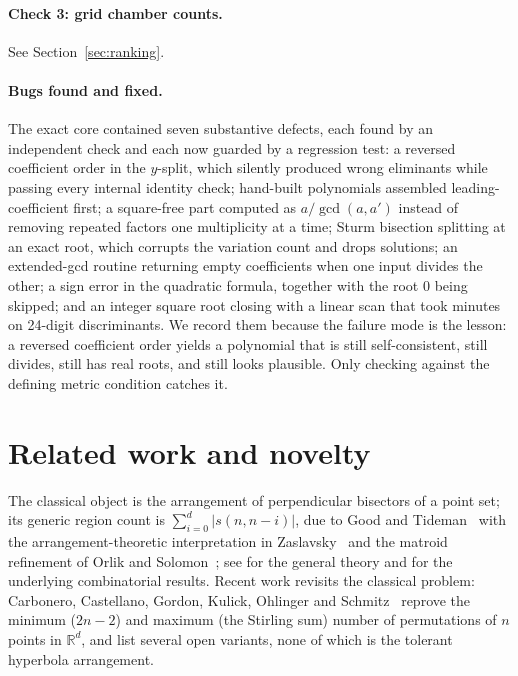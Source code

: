 ﻿\documentclass[11pt,a4paper]{article}
\theoremstyle{definition}
\theoremstyle{remark}
\newcommand{\RR}{\mathbb{R}}
\begin{document}
\paragraph{Check 3: grid chamber counts.}
See Section~\ref{sec:ranking}.

\paragraph{Bugs found and fixed.}
The exact core contained seven substantive defects, each found by an independent
check and each now guarded by a regression test: a reversed coefficient order in
the $y$-split, which silently produced wrong eliminants while passing every
internal identity check; hand-built polynomials assembled leading-coefficient
first; a square-free part computed as $a/\gcd(a,a')$ instead of removing repeated
factors one multiplicity at a time; Sturm bisection splitting at an exact root,
which corrupts the variation count and drops solutions; an extended-gcd routine
returning empty coefficients when one input divides the other; a sign error in
the quadratic formula, together with the root $0$ being skipped; and an integer
square root closing with a linear scan that took minutes on 24-digit
discriminants.  We record them because the failure mode is the lesson: a
reversed coefficient order yields a polynomial that is still self-consistent,
still divides, still has real roots, and still looks plausible.  Only checking
against the defining metric condition catches it.

\section{Related work and novelty}
\label{sec:related}

The classical object is the arrangement of perpendicular bisectors of a point
set; its generic region count is $\sum_{i=0}^{d}|s(n,n-i)|$, due to Good and
Tideman~\cite{good1977} with the arrangement-theoretic interpretation in
Zaslavsky~\cite{zaslavsky2002} and the matroid refinement of Orlik and
Solomon~\cite{orlik1980}; see \cite{orlik1992} for the general theory and
\cite{zaslavsky1975,rota1964} for the underlying combinatorial results.  Recent
work revisits the classical problem: Carbonero, Castellano, Gordon, Kulick,
Ohlinger and Schmitz~\cite{carbonero2022} reprove the minimum ($2n-2$) and
maximum (the Stirling sum) number of permutations of $n$ points in $\RR^d$, and
list several open variants, none of which is the tolerant hyperbola arrangement.
\end{document}
